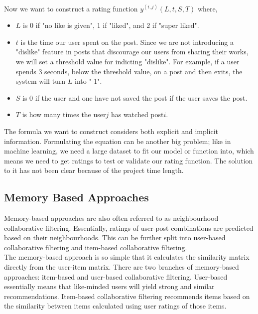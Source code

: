 \\Now we want to construct a rating function $y^{(i,j)}(L,t,S,T)$ where, 
\begin{itemize}
\item$L$ is 0 if "no like is given", 1 if "liked", and 2 if "super liked".
\item$t$ is the time our user spent on the post. Since we are not introducing a "dislike" feature in posts that discourage our users from sharing their works, we will set a threshold value for indicting "dislike". For example, if a user spends 3 seconds, below the threshold value, on a post and then exits, the system will turn $L$ into "-1".
\item$S$ is 0 if the user and one have not saved the post if the user saves the post.
\item$T$ is how many times the user$j$ has watched post$i$.
\end{itemize}
The formula we want to construct considers both explicit and implicit information. Formulating the equation can be another big problem; like in machine learning, we need a large dataset to fit our model or function into, which means we need to get ratings to test or validate our rating function. The solution to it has not been clear because of the project time length.

\subsection{Memory Based Approaches}
Memory-based approaches are also often referred to as neighbourhood collaborative filtering. Essentially, ratings of user-post combinations are predicted based on their neighbourhoods. 
This can be further split into user-based collaborative filtering and item-based collaborative filtering. 
\\The memory-based approach is so simple that it calculates the similarity matrix directly from the user-item matrix. There are two branches of memory-based approaches: item-based and user-based collaborative filtering. User-based essentially means that like-minded users will yield strong and similar recommendations. Item-based collaborative filtering recommends items based on the similarity between items calculated using user ratings of those items.

